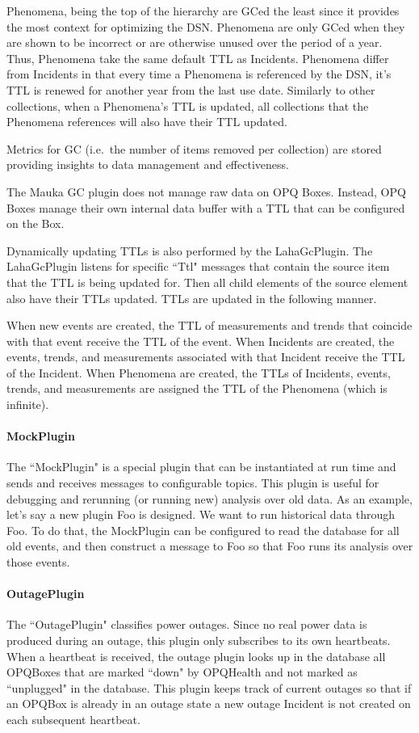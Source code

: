 Phenomena, being the top of the hierarchy are GCed the least since it provides the most context for optimizing the DSN. Phenomena are only GCed when they are shown to be incorrect or are otherwise unused over the period of a year. Thus, Phenomena take the same default TTL as Incidents. Phenomena differ from Incidents in that every time a Phenomena is referenced by the DSN, it's TTL is renewed for another year from the last use date. Similarly to other collections, when a Phenomena's TTL is updated, all collections that the Phenomena references will also have their TTL updated.

Metrics for GC (i.e.\ the number of items removed per collection) are stored providing insights to data management and effectiveness.

The Mauka GC plugin does not manage raw data on OPQ Boxes. Instead, OPQ Boxes manage their own internal data buffer with a TTL that can be configured on the Box.

Dynamically updating TTLs is also performed by the LahaGcPlugin. The LahaGcPlugin listens for specific ``Ttl" messages that contain the source item that the TTL is being updated for. Then all child elements of the source element also have their TTLs updated. TTLs are updated in the following manner.

When new events are created, the TTL of measurements and trends that coincide with that event receive the TTL of the event. When Incidents are created, the events, trends, and measurements associated with that Incident receive the TTL of the Incident. When Phenomena are created, the TTLs of Incidents, events, trends, and measurements are assigned the TTL of the Phenomena (which is infinite).

\paragraph{MockPlugin}
The ``MockPlugin" is a special plugin that can be instantiated at run time and sends and receives messages to configurable topics. This plugin is useful for debugging and rerunning (or running new) analysis over old data. As an example, let's say a new plugin Foo is designed. We want to run historical data through Foo. To do that, the MockPlugin can be configured to read the database for all old events, and then construct a message to Foo so that Foo runs its analysis over those events.

\paragraph{OutagePlugin}
The ``OutagePlugin" classifies power outages. Since no real power data is produced during an outage, this plugin only subscribes to its own heartbeats. When a heartbeat is received, the outage plugin looks up in the database all OPQBoxes that are marked ``down" by OPQHealth and not marked as ``unplugged" in the database. This plugin keeps track of current outages so that if an OPQBox is already in an outage state a new outage Incident is not created on each subsequent heartbeat.

